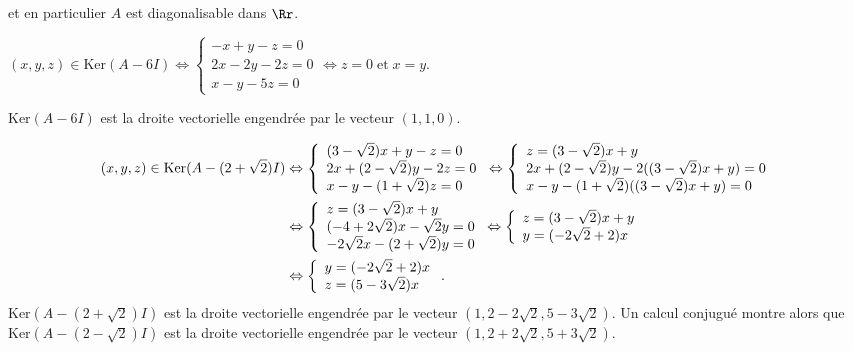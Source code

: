 {\begin{enumerate}
{et en particulier $A$ est diagonalisable dans $\Rr$.

\begin{center}
$(x,y,z)\in\text{Ker}(A-6I)\Leftrightarrow\left\{
\begin{array}{l}
-x+y-z=0\\
2x-2y-2z=0\\
x-y-5z=0
\end{array}
\right.\Leftrightarrow z=0\;\text{et}\;x=y$.
\end{center}

$\text{Ker}(A-6I)$ est la droite vectorielle engendrée par le vecteur $(1,1,0)$.

\begin{align*}\ensuremath
(x,y,z)\in\text{Ker}(A-(2+\sqrt{2})I)&\Leftrightarrow\left\{
\begin{array}{l}
(3-\sqrt{2})x+y-z=0\\
2x+(2-\sqrt{2})y-2z=0\\
x-y-(1+\sqrt{2})z=0
\end{array}
\right.\Leftrightarrow\left\{
\begin{array}{l}
z=(3-\sqrt{2})x+y\\
2x+(2-\sqrt{2})y-2((3-\sqrt{2})x+y)=0\\
x-y-(1+\sqrt{2})((3-\sqrt{2})x+y)=0
\end{array}
\right.
\\
 &\Leftrightarrow\left\{
\begin{array}{l}
z=(3-\sqrt{2})x+y\\
(-4+2\sqrt{2})x-\sqrt{2}y=0\\
-2\sqrt{2}x-(2+\sqrt{2})y=0
\end{array}
\right.\Leftrightarrow\left\{
\begin{array}{l}
z=(3-\sqrt{2})x+y\\
y=(-2\sqrt{2}+2)x
\end{array}
\right.\\
 &\Leftrightarrow\left\{
\begin{array}{l}
y=(-2\sqrt{2}+2)x\\
z=(5-3\sqrt{2})x
\end{array}
\right..
\end{align*} $\text{Ker}(A-(2+\sqrt{2})I)$ est la droite vectorielle engendrée par le vecteur $(1,2-2\sqrt{2},5-3\sqrt{2})$. Un calcul conjugué montre alors que $\text{Ker}(A-(2-\sqrt{2})I)$ est la droite vectorielle engendrée par le vecteur $(1,2+2\sqrt{2},5+3\sqrt{2})$.

}
\end{enumerate}}
